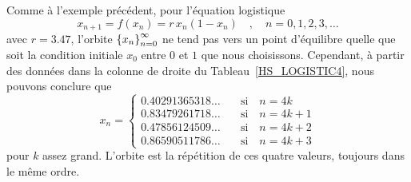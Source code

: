 {\begin{egg}
Comme à l'exemple précédent, pour l'équation logistique
\[
x_{n+1} = f(x_n) = r\, x_n(1-x_n) \quad , \quad n =0, 1, 2, 3, \ldots
\]
avec $r=3.47$, l'orbite $\displaystyle \left\{ x_n\right\}_{n=0}^\infty$
ne tend pas vers un point d'équilibre quelle que soit la condition
initiale $x_0$ entre $0$ et $1$ que nous choisissons.  Cependant, à partir
des données dans la colonne de droite du Tableau~\ref{HS_LOGISTIC4},
nous pouvons conclure que
\[
x_n =
\begin{cases}
0.40291365318\ldots &\quad \text{si} \quad n=4k \\
0.83479261718\ldots &\quad \text{si} \quad n=4k+1 \\
0.47856124509\ldots &\quad \text{si} \quad n=4k+2 \\
0.86590511786\ldots &\quad \text{si} \quad n=4k+3
\end{cases}
\]
pour $k$ assez grand.  L'orbite est la répétition de ces quatre
valeurs, toujours dans le même ordre.
\label{eggper2}
\end{egg}

}
